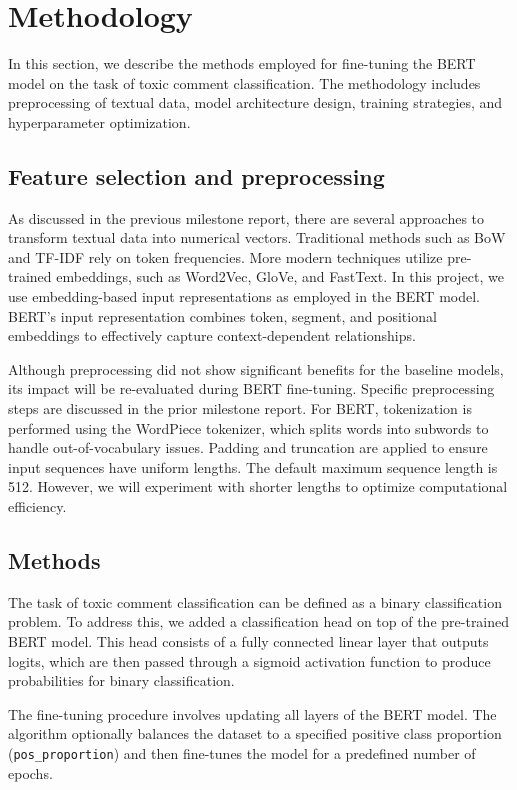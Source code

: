 \section{Methodology}\label{sec:meth}

In this section, we describe the methods employed for fine-tuning the BERT model on the task of toxic comment classification. The methodology includes preprocessing of textual data, model architecture design, training strategies, and hyperparameter optimization.

\subsection{Feature selection and preprocessing} As discussed in the previous milestone report, there are several approaches to transform textual data into numerical vectors. Traditional methods such as BoW and TF-IDF rely on token frequencies. More modern techniques utilize pre-trained embeddings, such as Word2Vec, GloVe, and FastText. In this project, we use embedding-based input representations as employed in the BERT model. BERT's input representation combines token, segment, and positional embeddings to effectively capture context-dependent relationships. \cite{Devlin2019}

Although preprocessing did not show significant benefits for the baseline models, its impact will be re-evaluated during BERT fine-tuning. Specific preprocessing steps are discussed in the prior milestone report. For BERT, tokenization is performed using the WordPiece tokenizer, which splits words into subwords to handle out-of-vocabulary issues. Padding and truncation are applied to ensure input sequences have uniform lengths. The default maximum sequence length is 512. However, we will experiment with shorter lengths to optimize computational efficiency.

\subsection{Methods}
The task of toxic comment classification can be defined as a binary classification problem. To address this, we added a classification head on top of the pre-trained BERT model. This head consists of a fully connected linear layer that outputs logits, which are then passed through a sigmoid activation function to produce probabilities for binary classification.

The fine-tuning procedure involves updating all layers of the BERT model. The algorithm optionally balances the dataset to a specified positive class proportion (\texttt{pos\_proportion}) and then fine-tunes the model for a predefined number of epochs.

